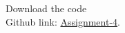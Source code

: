 \documentclass[10pt,a4paper]{report}
\begin{document}
\begin{multicols}{2}
\begin{center}
\begin{tabular}{|l|c|}
      \end{tabular}
  \end{center}
  
\raggedright  Download the code \\
Github link: \href{https://github.com/KrishnaYadati/Assignments/blob/main/Matrix-line_assignment/line_program/line1.py}{Assignment-4}.
  \end{multicols}
\end{document}
